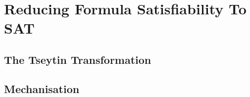 \chapter{Reducing Formula Satisfiability To SAT}

\section{The Tseytin Transformation}

\section{Mechanisation}
